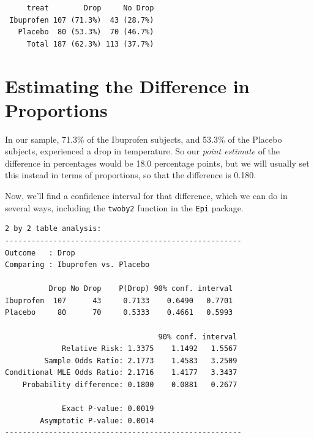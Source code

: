 \documentclass[
]{book}
\newenvironment{Shaded}{\begin{snugshade}}{\end{snugshade}}
\newcommand{\DataTypeTok}[1]{\textcolor[rgb]{0.13,0.29,0.53}{#1}}
\newcommand{\FloatTok}[1]{\textcolor[rgb]{0.00,0.00,0.81}{#1}}
\newcommand{\KeywordTok}[1]{\textcolor[rgb]{0.13,0.29,0.53}{\textbf{#1}}}
\newcommand{\NormalTok}[1]{#1}
\newcommand{\OperatorTok}[1]{\textcolor[rgb]{0.81,0.36,0.00}{\textbf{#1}}}
\newcommand{\StringTok}[1]{\textcolor[rgb]{0.31,0.60,0.02}{#1}}
\begin{document}
\begin{verbatim}
     treat        Drop     No Drop
 Ibuprofen 107 (71.3%)  43 (28.7%)
   Placebo  80 (53.3%)  70 (46.7%)
     Total 187 (62.3%) 113 (37.7%)
\end{verbatim}

\hypertarget{estimating-the-difference-in-proportions}{%
\section{Estimating the Difference in Proportions}\label{estimating-the-difference-in-proportions}}

In our sample, 71.3\% of the Ibuprofen subjects, and 53.3\% of the Placebo subjects, experienced a drop in temperature. So our \emph{point estimate} of the difference in percentages would be 18.0 percentage points, but we will usually set this instead in terms of proportions, so that the difference is 0.180.

Now, we'll find a confidence interval for that difference, which we can do in several ways, including the \texttt{twoby2} function in the \texttt{Epi} package.

\begin{Shaded}
\end{Shaded}

\begin{verbatim}
2 by 2 table analysis: 
------------------------------------------------------ 
Outcome   : Drop 
Comparing : Ibuprofen vs. Placebo 

          Drop No Drop    P(Drop) 90% conf. interval
Ibuprofen  107      43     0.7133    0.6490   0.7701
Placebo     80      70     0.5333    0.4661   0.5993

                                   90% conf. interval
             Relative Risk: 1.3375    1.1492   1.5567
         Sample Odds Ratio: 2.1773    1.4583   3.2509
Conditional MLE Odds Ratio: 2.1716    1.4177   3.3437
    Probability difference: 0.1800    0.0881   0.2677

             Exact P-value: 0.0019 
        Asymptotic P-value: 0.0014 
------------------------------------------------------
\end{verbatim}
\end{document}
